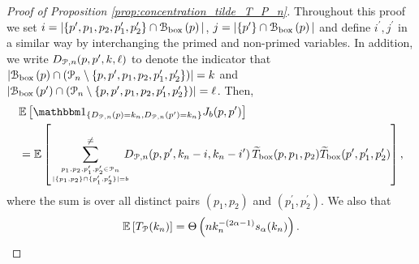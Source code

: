 \begin{proof}[Proof of Proposition \ref{prop:concentration_tilde_T_P_n}]

Throughout this proof we set $i = |\{p^\prime, p_1, p_2, p_1^\prime, p_2^\prime\} \cap {\mathcal B}_{\text{box}}\left(p\right)|$, $j = |\{p^\prime\} \cap {\mathcal B}_{\text{box}}\left(p\right)|$ and define $i^\prime, j^\prime$ in a similar way by interchanging the primed and non-primed variables. In addition, we write $D_{{\mathcal P},n}(p,p^\prime,k,\ell)$ to denote the indicator that $|{\mathcal B}_{\text{box}}\left(p\right) \cap ({\mathcal P}_n \setminus \{p, p^\prime, p_1, p_2, p_1^\prime, p_2^\prime\})| = k$ and $|{\mathcal B}_{\text{box}}\left(p^\prime\right) \cap ({\mathcal P}_n \setminus \{p, p^\prime, p_1, p_2, p_1^\prime, p_2^\prime\})| = \ell$. Then, 
\begin{align*}
	&\Exp{\ind{D_{\Pcal,n}(p) = k_n, D_{\Pcal,n}(p^\prime) = k_n} J_b(p,p^\prime)}\\
	&= \Exp{\sum_{p_1, p_2, p_1^\prime, p_2^\prime \in \Pcal_n 
		\atop |\{p_1, p_2\} \cap \{p_1^\prime, p_2^\prime\}| = b}^{\ne}
			\hspace{-7pt} D_{\Pcal,n}(p,p^\prime, k_n-i,k_n- i^\prime) \,
			\widetilde{T}_{\text{box}}(p,p_1,p_2) \widetilde{T}_{\text{box}}(p^\prime, p_1^\prime, p_2^\prime)},
\end{align*}
where the sum is over all distinct pairs $(p_1, p_2)$ and $(p_1^\prime, p_2^\prime)$. We also that 
\[
	\mathbb{E}\left[T_{{\mathcal P}}(k_n)\right] = \Theta\left(n k_n^{-(2\alpha - 1)} s_\alpha(k_n)\right).
\]



\end{proof}
